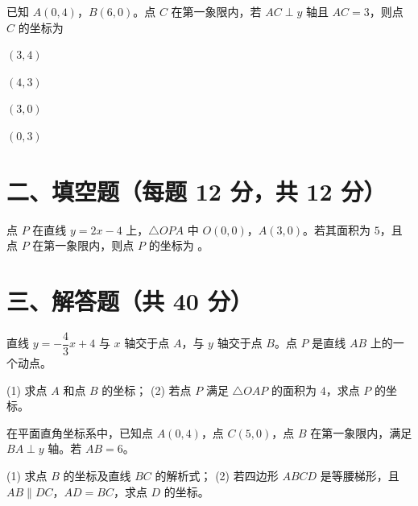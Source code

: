 \documentclass{exam-zh}
\newcommand{\answerarea}[1][40mm]{%
  \vspace{2mm}%
  \begin{tcolorbox}[
    enhanced, breakable,
    colback=white,
    colframe=white,
    boxrule=0pt,
    height=#1,
    valign=top,
    bottom=0mm,
    after skip=0mm,
  ]
  \end{tcolorbox}%
}
\begin{document}
\begin{question}[points=12]
  已知 $A(0, 4)$，$B(6, 0)$。点 $C$ 在第一象限内，若 $AC \perp y$ 轴且 $AC = 3$，则点 $C$ 的坐标为
  \begin{choices}
    \item $(3, 4)$
    \item $(4, 3)$
    \item $(3, 0)$
    \item $(0, 3)$
  \end{choices}
\end{question}


\section*{二、填空题（每题 12 分，共 12 分）}


\begin{question}[points=12]
  点 $P$ 在直线 $y = 2x - 4$ 上，$\triangle OPA$ 中 $O(0, 0)$，$A(3, 0)$。若其面积为 $5$，且点 $P$ 在第一象限内，则点 $P$ 的坐标为 \fillin。
\end{question}


\section*{三、解答题（共 40 分）}


\begin{problem}[points=20]
  直线 $y = -\dfrac{4}{3}x + 4$ 与 $x$ 轴交于点 $A$，与 $y$ 轴交于点 $B$。点 $P$ 是直线 $AB$ 上的一个动点。

(1) 求点 $A$ 和点 $B$ 的坐标；
(2) 若点 $P$ 满足 $\triangle OAP$ 的面积为 $4$，求点 $P$ 的坐标。
  \answerarea[60mm]
\end{problem}



\begin{problem}[points=20]
  在平面直角坐标系中，已知点 $A(0, 4)$，点 $C(5, 0)$，点 $B$ 在第一象限内，满足 $BA \perp y$ 轴。若 $AB = 6$。

(1) 求点 $B$ 的坐标及直线 $BC$ 的解析式；
(2) 若四边形 $ABCD$ 是等腰梯形，且 $AB \parallel DC$，$AD = BC$，求点 $D$ 的坐标。
  \answerarea[60mm]
\end{problem}
\end{document}
